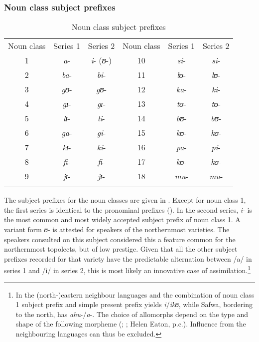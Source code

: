 \subsubsection{Noun class subject prefixes}\label{SubjectConcordsNCL}
\begin{table}[htb]
	\begin{center}
		\begin{tabular}{cccccc}
			\lsptoprule 
			\footnotesize{Noun class} & \footnotesize{Series 1} & \footnotesize{Series 2} & \footnotesize{Noun class} & \footnotesize{Series 1} & \footnotesize{Series 2}\\ 
			\cmidrule(r){1-3}\cmidrule(l){4-6}
			1 & \textit{a}- & \textit{i}- (\textit{ʊ}-) & 10 & \textit{si}- & \textit{si}-\\ 
			2 & \textit{ba}- & \textit{bi}- & 11 & \textit{lʊ}- & \textit{lʊ}-\\ 
			3 & \textit{gʊ}- & \textit{gʊ}- & 12 & \textit{ka}- & \textit{ki}-\\ 
			4 & \textit{gɪ}- & \textit{gɪ}- & 13 & \textit{tʊ}- & \textit{tʊ}-\\
			5 & \textit{lɪ}- & \textit{li}- & 14 & \textit{bʊ}- & \textit{bʊ}-\\
			6 & \textit{ga}- & \textit{gi}- & 15 & \textit{kʊ}- & \textit{kʊ}-\\
			7 & \textit{kɪ}- & \textit{ki}- & 16 & \textit{pa}- & \textit{pi}-\\
			8 & \textit{fi}- & \textit{fi}- & 17 & \textit{kʊ}- & \textit{kʊ}-\\
			9 & \textit{jɪ}- & \textit{jɪ}- & 18 & \textit{mu}- & \textit{mu}-\\
			\lspbottomrule
		\end{tabular} 
	\caption{Noun class subject prefixes}\label{tableSMNCL}
	
	\end{center}
\end{table}

The subject prefixes for the noun classes are given in . Except for noun class 1, the first series is identical to the pronominal prefixes (). In the second series, \textit{i}- is the most common and most widely accepted subject prefix of noun class 1. A variant form \textit{ʊ}- is attested for speakers of the northernmost varieties. The speakers consulted on this subject considered this a feature common for the northernmost topolects, but of low prestige. Given that all the other subject prefixes recorded for that variety have the predictable alternation between /a/ in series 1 and /i/ in series 2, this is most likely an innovative case of assimilation.\footnote{In the (north-)eastern neighbour languages  and  the combination of noun class 1 subject prefix and simple present prefix yields \textit{i}/\textit{ikʊ}, while Safwa, bordering to the north, has \textit{ahu}-/\textit{a}-. The choice of allomorphs depend on the type and shape of the following morpheme (\citealt{WolffR1905}; \citealt{VoorhoeveJsa}; Helen Eaton, p.c.). Influence from the neighbouring languages can thus be excluded.}
